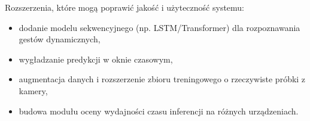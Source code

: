 Rozszerzenia, które mogą poprawić jakość i użyteczność systemu:
\begin{itemize}
    \item dodanie modelu sekwencyjnego (np. LSTM/Transformer) dla rozpoznawania
          gestów dynamicznych,
    \item wygładzanie predykcji w oknie czasowym,
    \item augmentacja danych i rozszerzenie zbioru treningowego o rzeczywiste
          próbki z kamery,
    \item budowa modułu oceny wydajności czasu inferencji na różnych urządzeniach.
\end{itemize}
